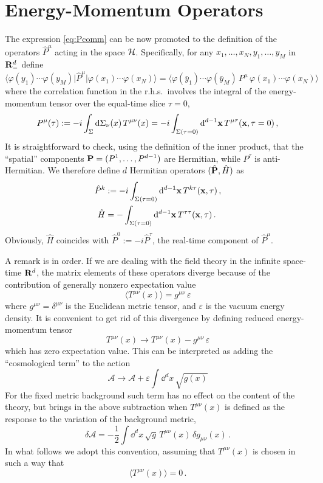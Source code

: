 \section{Energy-Momentum Operators}

The expression \eqref{eq:Pcomm} can be now promoted to the definition of the
operators $\hat P^\mu$ acting in the space $\mathcal{H}$. Specifically, for any
$x_1,\dots,x_N,y_1,\dots,y_M$ in $\mathbf{R}^d_-$ define
\begin{equation}\label{eq:Pmatrix}
\bigl\langle\varphi(y_1)\cdots\varphi(y_M)\big|\hat P^\mu\big|\varphi(x_1)\cdots\varphi(x_N)\bigr\rangle
=\bigl\langle\varphi(\bar y_1)\cdots\varphi(\bar y_M)\,P^\mu\,\varphi(x_1)\cdots\varphi(x_N)\bigr\rangle
\end{equation}
where the correlation function in the r.h.s.\ involves the integral of the
energy-momentum tensor over the equal-time slice $\tau=0$,
\begin{equation}\label{eq:Pdef}
P^\mu(\tau):=-i\int_\Sigma \mathop{}\!\mathrm{d}\Sigma_\nu(x)\,T^{\mu\nu}(x)=-i\int_{\Sigma(\tau=0)}\mathop{}\!\mathrm{d}^{d-1}\mathbf{x}\,T^{\mu\tau}(\mathbf{x},\tau=0)\,,
\end{equation}
It is straightforward to check, using the definition of the inner product, that the
``spatial'' components $\mathbf{P}=(P^1,\dots,P^{d-1})$ are Hermitian, while $P^\tau$ is
anti-Hermitian. We therefore define $d$ Hermitian operators $(\hat{\mathbf{P}},\hat H)$ as
\begin{align}
\hat P^k&:=-i\int_{\Sigma(\tau=0)}\mathop{}\!\mathrm{d}^{d-1}\mathbf{x}\,T^{k\tau}(\mathbf{x},\tau)\,,\label{eq:Pk}\\
\hat H&=-\int_{\Sigma(\tau=0)}\mathop{}\!\mathrm{d}^{d-1}\mathbf{x}\,T^{\tau\tau}(\mathbf{x},\tau)\,.\label{eq:Hdef}
\end{align}
Obviously, $\hat H$ coincides with $\hat P^0:=-i\hat P^\tau$, the real-time
component of $\hat P^\mu$.

A remark is in order. If we are dealing with the field theory in the infinite
space-time $\mathbf{R}^d$, the matrix elements of these operators diverge because of the
contribution of generally nonzero expectation value
\[
\bigl\langle T^{\mu\nu}(x)\bigr\rangle=g^{\mu\nu}\,\varepsilon
\]
where $g^{\mu\nu}=\delta^{\mu\nu}$ is the Euclidean metric tensor, and
$\varepsilon$ is the vacuum energy density. It is convenient to get rid of this
divergence by defining reduced energy-momentum tensor
\[
T^{\mu\nu}(x)\to T^{\mu\nu}(x)-g^{\mu\nu}\,\varepsilon
\]
which has zero expectation value. This can be interpreted as adding the
``cosmological term'' to the action
\[
\mathcal A\to\mathcal A+\varepsilon\int \dd^dx\,\sqrt{g(x)}
\]
For the fixed metric background such term has no effect on the content of the
theory, but brings in the above subtraction when $T^{\mu\nu}(x)$ is defined as the
response to the variation of the background metric,
\[
\delta\mathcal A=-\frac12\int \dd^dx\,\sqrt g\,T^{\mu\nu}(x)\,\delta g_{\mu\nu}(x)\,.
\]
In what follows we adopt this convention, assuming that $T^{\mu\nu}(x)$ is chosen in
such a way that
\begin{equation}\label{eq:Tvev0}
\bigl\langle T^{\mu\nu}(x)\bigr\rangle=0\,.
\end{equation}

